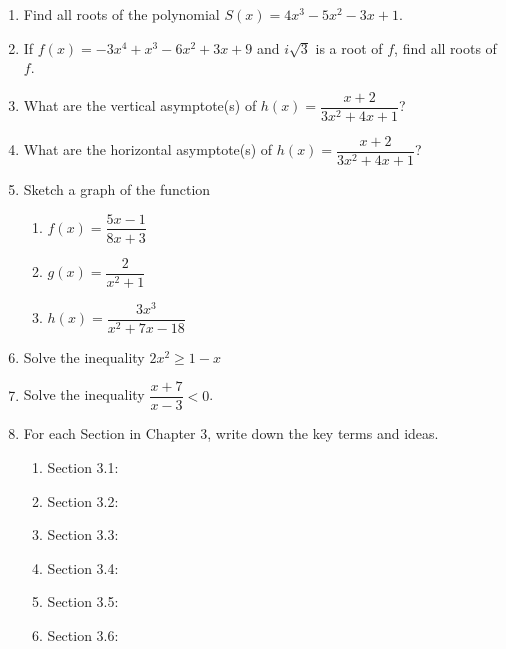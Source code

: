 \documentclass[12pt]{article}
\begin{document}
\begin{enumerate}
		\newpage
	\item Find all roots of the polynomial $S(x)=4x^{3} - 5x^{2} - 3x + 1$.
		\vfill
	\item If $f(x)=-3x^{4} + x^{3} - 6x^{2} + 3x + 9$ and $i\sqrt{3}$ is a root of $f$, find all roots of $f$.
		\vfill
		\newpage
	\item What are the vertical asymptote(s) of $h(x)=\dfrac{x+2}{3x^{2} + 4x + 1}$?
		\vfill
	\item What are the horizontal asymptote(s) of $h(x)=\dfrac{x+2}{3x^{2} + 4x + 1}$?
		\vfill
	\item Sketch a graph of the function
		\begin{enumerate}
			\item $f(x)=\dfrac{5x-1}{8x+3}$
			\vfill\vfill\vfill\vfill
			\newpage
			\item $g(x)=\dfrac{2}{x^2+1}$
			\vfill
			\item $h(x)=\dfrac{3x^3}{x^2+7x-18}$
			\vfill
		\end{enumerate}
	\newpage
	\item Solve the inequality $2x^{2}\geq1-x$
	\vfill
	\item Solve the inequality $\dfrac{x+7}{x-3}<0$.
	\vfill
	\newpage
	
	\item For each Section in Chapter 3, write down the key terms and ideas.
	\begin{enumerate}
		\item Section 3.1: \vfill
		\item Section 3.2: \vfill
		\item Section 3.3: \vfill
		\newpage
		\item Section 3.4: \vfill
		\item Section 3.5: \vfill 
		\item Section 3.6: \vfill 
	\end{enumerate}
\end{enumerate}
\end{document}
